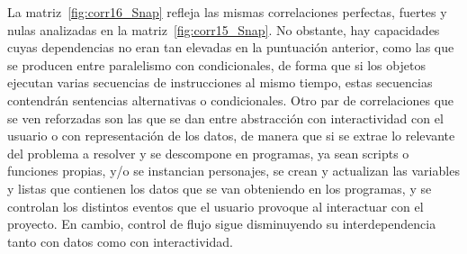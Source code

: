 \documentclass[a4paper, 12pt]{book}
\begin{document}
La matriz~\ref{fig:corr16_Snap} refleja las mismas correlaciones perfectas, fuertes y nulas analizadas en la matriz~\ref{fig:corr15_Snap}. No obstante, hay capacidades cuyas dependencias no eran tan elevadas en la puntuación anterior, como las que se producen entre paralelismo con condicionales, de forma que si los objetos ejecutan varias secuencias de instrucciones al mismo tiempo, estas secuencias contendrán sentencias alternativas o condicionales. Otro par de correlaciones que se ven reforzadas son las que se dan entre abstracción con interactividad con el usuario o con representación de los datos, de manera que si se extrae lo relevante del problema a resolver y se descompone en programas, ya sean scripts o funciones propias, y/o se instancian personajes, se crean y actualizan las variables y listas que contienen los datos que se van obteniendo en los programas, y se controlan los distintos eventos que el usuario provoque al interactuar con el proyecto. En cambio, control de flujo sigue disminuyendo su interdependencia tanto con datos como con interactividad. 
\end{document}

